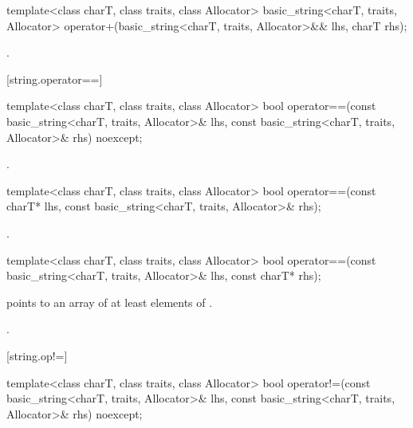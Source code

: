 %
\begin{itemdecl}
template<class charT, class traits, class Allocator>
  basic_string<charT, traits, Allocator>
    operator+(basic_string<charT, traits, Allocator>&& lhs, charT rhs);
\end{itemdecl}

\begin{itemdescr}
\pnum
\returns
{}.
\end{itemdescr}

[string.operator==]{}

%
\begin{itemdecl}
template<class charT, class traits, class Allocator>
  bool operator==(const basic_string<charT, traits, Allocator>& lhs,
                  const basic_string<charT, traits, Allocator>& rhs) noexcept;
\end{itemdecl}

\begin{itemdescr}
\pnum
\returns
{}.
\end{itemdescr}

%
\begin{itemdecl}
template<class charT, class traits, class Allocator>
  bool operator==(const charT* lhs, const basic_string<charT, traits, Allocator>& rhs);
\end{itemdecl}

\begin{itemdescr}
\pnum
\returns
{}.
\end{itemdescr}

%
\begin{itemdecl}
template<class charT, class traits, class Allocator>
  bool operator==(const basic_string<charT, traits, Allocator>& lhs, const charT* rhs);
\end{itemdecl}

\begin{itemdescr}
\pnum
\requires {} points to an array of at least 
elements of .

\pnum
\returns
{}.
\end{itemdescr}

[string.op!=]{}

%
\begin{itemdecl}
template<class charT, class traits, class Allocator>
  bool operator!=(const basic_string<charT, traits, Allocator>& lhs,
                  const basic_string<charT, traits, Allocator>& rhs) noexcept;
\end{itemdecl}

